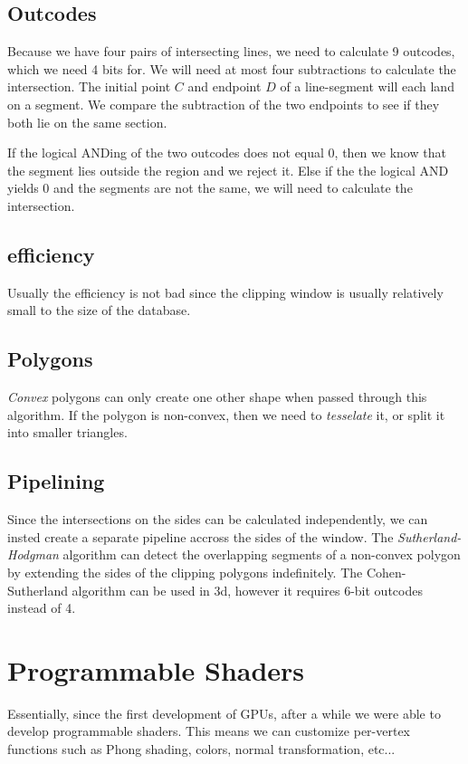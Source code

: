 \documentclass[portrait, 10pt, a4paper]{article}
\begin{document}
\begin{multicols*}{3}
		\subsection{Outcodes}	
			Because we have four pairs of intersecting lines, we need to calculate 9 outcodes, which we need 4 
			bits for. We will need at most four subtractions to calculate the intersection. The initial point $C$
			and endpoint $D$ of a line-segment will each land on a segment. We compare the subtraction of the 
			two endpoints to see if they both lie on the same section. 

			If the logical ANDing of the two outcodes does not equal 0, then we know that the segment lies outside
			the region and we reject it. Else if the the logical AND yields 0 and the segments are not the same, 
			we will need to calculate the intersection.
		\subsection{efficiency}
			Usually the efficiency is not bad since the clipping window is usually relatively small to the size of the
			database.
		\subsection{Polygons}
			\textit{Convex} polygons can only create one other shape when passed through this algorithm. If the polygon
			is non-convex, then we need to \textit{tesselate} it, or split it into smaller triangles.
		\subsection{Pipelining}
			Since the intersections on the sides can be calculated independently, we can insted create a separate 
			pipeline accross the sides of the window. The \textit{Sutherland-Hodgman} algorithm can detect the overlapping
			segments of a non-convex polygon by extending the sides of the clipping polygons indefinitely. The 
			Cohen-Sutherland algorithm can be used in 3d, however it requires 6-bit outcodes instead of 4.
\section{Programmable Shaders}
		Essentially, since the first development of GPUs, after a while we were able to develop programmable shaders. 
		This means we can customize per-vertex functions such as Phong shading, colors, normal transformation, etc...


\end{multicols*}
\end{document}
